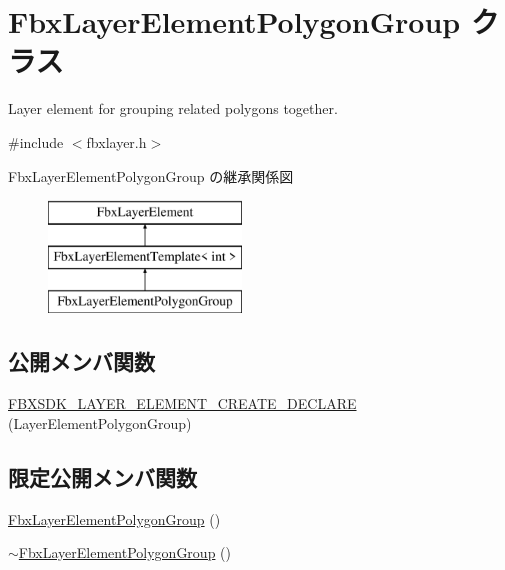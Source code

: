 \hypertarget{class_fbx_layer_element_polygon_group}{}\section{Fbx\+Layer\+Element\+Polygon\+Group クラス}
\label{class_fbx_layer_element_polygon_group}


Layer element for grouping related polygons together.  




{\ttfamily \#include $<$fbxlayer.\+h$>$}

Fbx\+Layer\+Element\+Polygon\+Group の継承関係図\begin{figure}[H]
\begin{center}
\leavevmode
\includegraphics[height=3.000000cm]{class_fbx_layer_element_polygon_group}
\end{center}
\end{figure}
\subsection*{公開メンバ関数}
\begin{DoxyCompactItemize}
\item 
\hyperlink{class_fbx_layer_element_polygon_group_a604999a25c284efdfe88b784b468604e}{F\+B\+X\+S\+D\+K\+\_\+\+L\+A\+Y\+E\+R\+\_\+\+E\+L\+E\+M\+E\+N\+T\+\_\+\+C\+R\+E\+A\+T\+E\+\_\+\+D\+E\+C\+L\+A\+RE} (Layer\+Element\+Polygon\+Group)
\end{DoxyCompactItemize}
\subsection*{限定公開メンバ関数}
\begin{DoxyCompactItemize}
\item 
\hyperlink{class_fbx_layer_element_polygon_group_a2d46c9bfe9674b49f802b2cabf3b041c}{Fbx\+Layer\+Element\+Polygon\+Group} ()
\item 
\hyperlink{class_fbx_layer_element_polygon_group_a7d1bbdb9134916b62a6f570e3d2e3bcd}{$\sim$\+Fbx\+Layer\+Element\+Polygon\+Group} ()
\end{DoxyCompactItemize}
